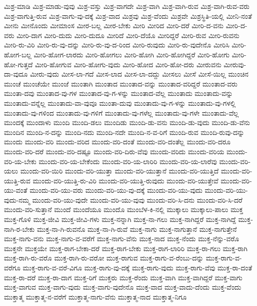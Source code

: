 {ಮಿಶ್ರ-ಮಾಡಿ
ಮಿಶ್ರ-ಮಾಡು-ವುವು
ಮಿಶ್ರ-ವಸ್ತು
ಮಿಶ್ರ-ವಾಗದೇ
ಮಿಶ್ರ-ವಾಗಿ
ಮಿಶ್ರ-ವಾಗಿ-ರುವ
ಮಿಶ್ರ-ವಾಗಿ-ರುವ-ವರು
ಮಿಶ್ರ-ವಾಗುತ್ತಿ-ರುವ
ಮಿಶ್ರ-ವಾಗು-ವು-ದಕ್ಕೆ
ಮಿಶ್ರ-ವಾದ
ಮಿಶ್ರವು
ಮಿಶ್ರ-ವೆಂದು
ಮಿಶ್ರವೇ
ಮಿಶ್ರಸ್ಥಿತಿ-ಯಲ್ಲಿ
ಮೀನಿ-ನಂತೆ
ಮೀನು
ಮೀನೊಂದು
ಮೀಮಾಂಸ
ಮೀರ-ಬಲ್ಲ
ಮೀರ-ಬೇಕು
ಮೀರಿ
ಮೀರಿದ
ಮೀರಿ-ದರೆ
ಮೀರಿ-ದ-ವನು
ಮೀರಿ-ದ-ವರು
ಮೀರಿ-ದಾಗ
ಮೀರಿ-ದುದು
ಮೀರಿ-ದುದೂ
ಮೀರಿದೆ
ಮೀರಿ-ದೆಯೊ
ಮೀರಿದ್ದರೆ
ಮೀರಿ-ರುವ
ಮೀರಿ-ರುವನು
ಮೀರಿ-ರು-ವಿರಿ
ಮೀರಿ-ರು-ವು-ದನ್ನು
ಮೀರಿ-ರು-ವು-ದ-ರಿಂದ
ಮೀರಿ-ರುವುದು
ಮೀರಿ-ರು-ವುದೇನೊ
ಮೀರಿಸಿ
ಮೀರಿ-ಹೋಗ-ಬಲ್ಲ
ಮೀರಿ-ಹೋಗ-ಲಾರದು
ಮೀರಿ-ಹೋಗಲು
ಮೀರಿ-ಹೋಗಿ
ಮೀರಿ-ಹೋಗಿದ್ದರೆ
ಮೀರಿ-ಹೋಗು
ಮೀರಿ-ಹೋ-ಗುತ್ತದೆ
ಮೀರಿ-ಹೋಗುವ
ಮೀರಿ-ಹೋಗು-ವುದು
ಮೀರಿ-ಹೋದ
ಮೀರಿ-ಹೋ-ದರು
ಮೀರುವನು
ಮೀರುವು-ದಾ-ವುದೂ
ಮೀರು-ವುದು
ಮೀಸ-ಲಾ-ಗದೆ
ಮೀಸ-ಲಾದ
ಮೀಸ-ಲಾ-ದದ್ದು
ಮೀಸಲು
ಮೀಸೆ
ಮೀಸೆ-ಯಿಲ್ಲ
ಮುಂಚಿನ
ಮುಂಚೆ
ಮುಂಚೆಯೇ
ಮುಂಜೆ
ಮುಂತಾಗಿ
ಮುಂತಾದ
ಮುಂತಾದ-ವನ್ನು
ಮುಂತಾದ-ವರಿದ್ದರೆ
ಮುಂತಾದ-ವರು
ಮುಂತಾ-ದವು
ಮುಂತಾದ-ವು-ಗಳ
ಮುಂತಾದ-ವು-ಗ-ಳನ್ನು
ಮುಂತಾದ-ವೆಲ್ಲ
ಮುಂತಾದು
ಮುಂತಾದು-ವನ್ನು
ಮುಂತಾದು-ವನ್ನೆಲ್ಲ
ಮುಂತಾದು-ವಾ-ವುವೂ
ಮುಂತಾ-ದುವು
ಮುಂತಾದು-ವು-ಗ-ಳನ್ನು
ಮುಂತಾದು-ವು-ಗಳಲ್ಲಿ
ಮುಂತಾದು-ವು-ಗಳಿಂದ
ಮುಂತಾದು-ವು-ಗಳಿಗೆ
ಮುಂತಾದು-ವು-ಗಳೆಲ್ಲ
ಮುಂತಾದು-ವು-ಗಳೇ
ಮುಂತಾದು-ವೆಲ್ಲ
ಮುಂದಕ್ಕೆ
ಮುಂದಾಳು
ಮುಂದಿ
ಮುಂದಿ-ಡಲು
ಮುಂದಿಡು
ಮುಂದಿ-ಡು-ವನು
ಮುಂದಿ-ಡು-ವುದು
ಮುಂದಿ-ಡು-ವೆನು
ಮುಂದಿನ
ಮುಂದಿ-ನ-ದನ್ನು
ಮುಂದಿ-ನದು
ಮುಂದಿ-ನದೇ
ಮುಂದಿ-ನ-ವ-ರಿಗೆ
ಮುಂದಿ-ರುವ
ಮುಂದಿ-ರುವು-ದನ್ನು
ಮುಂದು
ಮುಂದು-ವರಿ
ಮುಂದು-ವರಿದ
ಮುಂದು-ವರಿ-ದಂತೆ
ಮುಂದು-ವರಿ-ದಂತೆಲ್ಲ
ಮುಂದು-ವರಿ-ದರೂ
ಮುಂದು-ವರಿ-ದರೆ
ಮುಂದು-ವರಿ-ದಷ್ಟೂ
ಮುಂದು-ವರಿ-ದಿರು-ವೆವು
ಮುಂದು-ವರಿದು
ಮುಂದು-ವರಿಯ
ಮುಂದು-ವರಿ-ಯ-ಬೇಕು
ಮುಂದು-ವರಿ-ಯ-ಬೇಕೆಂದು
ಮುಂದು-ವರಿ-ಯ-ಲಾರಿರಿ
ಮುಂದು-ವರಿ-ಯ-ಲಾರೆವು
ಮುಂದು-ವರಿ-ಯಲು
ಮುಂದು-ವರಿ-ಯಿರಿ
ಮುಂದು-ವರಿ-ಯುತ್ತಾ
ಮುಂದು-ವರಿ-ಯುತ್ತಾನೆ
ಮುಂದು-ವರಿ-ಯುತ್ತಿದೆ
ಮುಂದು-ವರಿ-ಯುತ್ತಿ-ರುವ
ಮುಂದು-ವರಿ-ಯುತ್ತಿ-ರು-ವಿರಿ
ಮುಂದು-ವರಿ-ಯುತ್ತಿ-ರುವುದು
ಮುಂದು-ವರಿ-ಯುತ್ತೇವೆ
ಮುಂದು-ವರಿ-ಯು-ವಂತೆ
ಮುಂದು-ವರಿ-ಯು-ವರು
ಮುಂದು-ವರಿ-ಯು-ವು-ದಕ್ಕೆ
ಮುಂದು-ವರಿ-ಯು-ವುದು
ಮುಂದು-ವರಿ-ಯು-ವುದು-ನಮ್ಮ
ಮುಂದು-ವರಿ-ಯು-ವುದೇ
ಮುಂದು-ವರಿ-ಯು-ವುವು
ಮುಂದು-ವರಿ-ಸಿ-ದನು
ಮುಂದು-ವರಿ-ಸಿ-ದರೆ
ಮುಂದು-ವರಿ-ಸುತ್ತಾನೆ
ಮುಂದೆ
ಮುಂದೆಯೂ
ಮುಂದೊ
ಮುಂಬೆಳ-ಕಿ-ನಲ್ಲಿ
ಮುಕ್ಕಾಲು
ಮುಕ್ಕಾಲು-ಪಾಲು
ಮುಕ್ತ
ಮುಕ್ತ-ಗೊಳಿ
ಮುಕ್ತ-ಜೀವಿ
ಮುಕ್ತ-ಜೀವಿ-ಗಳು
ಮುಕ್ತ-ನನ್ನಾಗಿ
ಮುಕ್ತ-ನಾ-ಗಲು
ಮುಕ್ತ-ನಾಗಿದ್ದರೆ
ಮುಕ್ತ-ನಾಗಿದ್ದೆ
ಮುಕ್ತ-ನಾಗಿ-ರ-ಬೇಕು
ಮುಕ್ತ-ನಾ-ಗಿ-ರುವನೊ
ಮುಕ್ತ-ನಾ-ಗಿ-ರುವೆ
ಮುಕ್ತ-ನಾಗು
ಮುಕ್ತ-ನಾಗುತ್ತಾನೆ
ಮುಕ್ತ-ನಾಗುತ್ತೇನೆ
ಮುಕ್ತ-ನಾಗು-ವನು
ಮುಕ್ತ-ನಾಗು-ವ-ವರೆಗೆ
ಮುಕ್ತ-ನಾಗು-ವೆನು
ಮುಕ್ತ-ನಾದ
ಮುಕ್ತ-ನೆಂದು
ಮುಕ್ತ-ನೆನ್ನು-ವರೊ
ಮುಕ್ತನೇ
ಮುಕ್ತಯೇ
ಮುಕ್ತ-ರಾಗ-ಬೇಕಾ-ದರೆ
ಮುಕ್ತ-ರಾಗ-ಬೇಕು
ಮುಕ್ತ-ರಾಗ-ಲಾರಿರಿ
ಮುಕ್ತ-ರಾ-ಗಲು
ಮುಕ್ತ-ರಾಗಿ
ಮುಕ್ತ-ರಾಗಿ-ರು-ವರೊ
ಮುಕ್ತ-ರಾಗಿ-ರು-ವರೋ
ಮುಕ್ತ-ರಾಗುವ
ಮುಕ್ತ-ರಾಗು-ವ-ರೆಂಬು-ದನ್ನು
ಮುಕ್ತ-ರಾಗು-ವ-ವರೆಗೂ
ಮುಕ್ತ-ರಾಗು-ವ-ವರೆ-ವಿಗೂ
ಮುಕ್ತ-ರಾಗು-ವು-ದಕ್ಕೆ
ಮುಕ್ತ-ರಾಗು-ವುದು
ಮುಕ್ತ-ರಾಗು-ವೆವು
ಮುಕ್ತ-ರಾ-ದಂತೆ
ಮುಕ್ತ-ರಾ-ದರೆ
ಮುಕ್ತ-ರಾ-ದಾಗ
ಮುಕ್ತ-ರಿಗೆ
ಮುಕ್ತರು
ಮುಕ್ತ-ರೆಂದು
ಮುಕ್ತ-ವಾಗಿ
ಮುಕ್ತ-ವಾಗಿದ್ದರೆ
ಮುಕ್ತ-ವಾಗು
ಮುಕ್ತ-ವಾಗುವ
ಮುಕ್ತ-ವಾಗು-ವುದು
ಮುಕ್ತ-ವಾಗು-ವುದೇನೊ
ಮುಕ್ತ-ವಾದ
ಮುಕ್ತ-ವಾದು-ದೆಂದು
ಮುಕ್ತ-ವೆಂದು
ಮುಕ್ತಾತ್ಮ
ಮುಕ್ತಾತ್ಮ-ನ-ವರೆಗೆ
ಮುಕ್ತಾತ್ಮ-ನಾಗು-ವೆನು
ಮುಕ್ತಾತ್ಮ-ನಾದ
ಮುಕ್ತಾತ್ಮ-ನಿಗೂ
}
